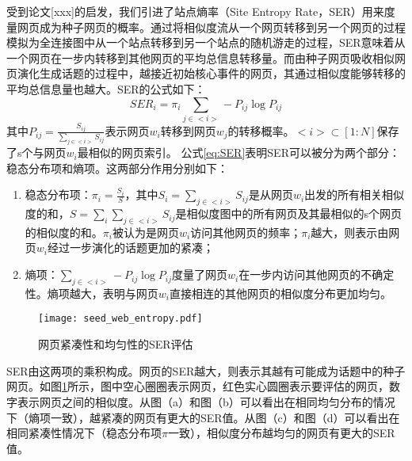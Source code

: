 受到论文[xxx]的启发，我们引进了站点熵率（Site Entropy Rate，SER）用来度量网页成为种子网页的概率。通过将相似度流从一个网页转移到另一个网页的过程模拟为全连接图中从一个站点转移到另一个站点的随机游走的过程，SER意味着从一个网页在一步内转移到其他网页的平均总信息转移量。而由种子网页吸收相似网页演化生成话题的过程中，越接近初始核心事件的网页，其通过相似度能够转移的平均总信息量也越大。SER的公式如下：
\begin{equation} \label{eq:SER}
SER_i = \pi_i\sum_{j\in<i>}-P_{ij}\log P_{ij}
\end{equation}
其中$P_{ij}=\frac{S_{ij}}{\sum_{j\in<i>}S_{ij}}$表示网页$w_i$转移到网页$w_j$的转移概率。$<i>\subset[1:N]$保存了s个与网页$w_i$最相似的网页索引。
公式\ref{eq:SER}表明SER可以被分为两个部分：稳态分布项和熵项。这两部分作用分别如下：
\begin{enumerate}
  \item[1)] 稳态分布项：$\pi_i = \frac{S_i}{S}$，其中$S_i=\sum_{j\in<i>}S_{ij}$是从网页$w_i$出发的所有相关相似度的和，$S = \sum_{i}\sum_{j\in<i>}S_{ij}$是相似度图中的所有网页及其最相似的s个网页的相似度的和。$\pi_i$被认为是网页$w_i$访问其他网页的频率；$\pi_i$越大，则表示由网页$w_i$经过一步演化的话题更加的紧凑；
  \item[2)] 熵项：$\sum_{j\in<i>}-P_{ij}\log P_{ij}$度量了网页$w_i$在一步内访问其他网页的不确定性。熵项越大，表明与网页$w_i$直接相连的其他网页的相似度分布更加均匀。
\end{enumerate}

\begin{figure}[!htbp]
    \centering
    \texttt{[image: seed\_web\_entropy.pdf]}
    \caption{网页紧凑性和均匀性的SER评估}
    \label{fig:seed_web_entropy}
\end{figure}

SER由这两项的乘积构成。网页的SER越大，则表示其越有可能成为话题中的种子网页。如图\ref{fig:seed_web_entropy}所示，图中空心圈圈表示网页，红色实心圆圈表示要评估的网页，数字表示网页之间的相似度。从图（a）和图（b）可以看出在相同均匀分布的情况下（熵项一致），越紧凑的网页有更大的SER值。从图（c）和图（d）可以看出在相同紧凑性情况下（稳态分布项$\pi$一致），相似度分布越均匀的网页有更大的SER值。

